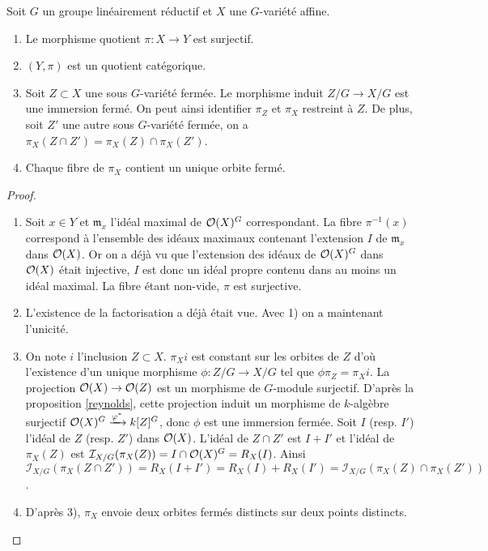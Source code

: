 \begin{thm}\label{goodquotientthm}
Soit $G$ un groupe linéairement réductif et $X$ une $G$-variété affine.
\begin{enumerate}
\item Le morphisme quotient $\pi:X\rightarrow Y$ est surjectif.
\item $(Y, \pi)$ est un quotient catégorique.
\item Soit $Z\subset X$ une sous $G$-variété fermée. Le morphisme induit $Z/G \rightarrow X/G$ est une immersion fermé. On peut ainsi identifier $\pi_Z$ et $\pi_X$ restreint à $Z$. De plus, soit $Z'$ une autre sous $G$-variété fermée, on a $\pi_X(Z\cap Z')=\pi_X(Z)\cap\pi_X(Z')$.
\item Chaque fibre de $\pi_X$ contient un unique orbite fermé.
\end{enumerate}
\end{thm}
\begin{proof}
\begin{enumerate}
\item Soit $x\in Y$ et $\mathfrak{m}_x$ l'idéal maximal de $\mathcal{O}(X)^G$ correspondant. La fibre $\pi^{-1}(x)$ correspond à l'ensemble des idéaux maximaux contenant l'extension $I$ de $\mathfrak{m}_x$ dans $\mathcal{O}(X)$. Or on a déjà vu que l'extension des idéaux de $\mathcal{O}(X)^G$ dans $\mathcal{O}(X)$ était injective, $I$ est donc un idéal propre contenu dans au moins un idéal maximal. La fibre étant non-vide, $\pi$ est surjective.
\item L'existence de la factorisation a déjà était vue. Avec 1) on a maintenant l'unicité.
\item On note $i$ l'inclusion $Z\subset X$. $\pi_Xi$ est constant sur les orbites de $Z$ d'où l'existence d'un unique morphisme $\phi:Z/G\rightarrow X/G$ tel que $\phi\pi_Z=\pi_Xi$. La projection $\mathcal{O}(X) \rightarrow \mathcal{O}(Z)$ est un morphisme de $G$-module surjectif. D'après la proposition \ref{reynolds}, cette projection induit un morphisme de $k$-algèbre surjectif $\mathcal{O}(X)^G \xrightarrow{\varphi^*} k[Z]^G$, donc $\phi$ est une immersion fermée.
Soit $I$ (resp. $I'$) l'idéal de $Z$ (resp. $Z'$) dans $\mathcal{O}(X)$. L'idéal de $Z\cap Z'$ est $I+I'$ et l'idéal de $\pi_X(Z)$ est $\mathcal{I}_{X/G}(\pi_X(Z))=I\cap \mathcal{O}(X)^G=R_X(I)$. Ainsi $\mathcal{I}_{X/G}(\pi_X(Z\cap Z'))=R_X(I+I')=R_X(I)+R_X(I')=\mathcal{I}_{X/G}(\pi_X(Z)\cap \pi_X(Z'))$.
\item D'après 3), $\pi_X$ envoie deux orbites fermés distincts sur deux points distincts.
\end{enumerate}
\end{proof}

